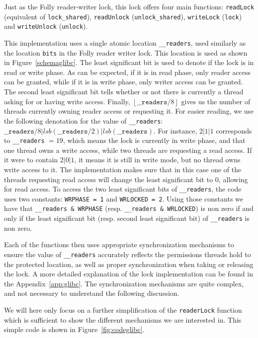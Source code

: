 Just as the Folly reader-writer lock, this lock offers four main functions: \texttt{readLock} (equivalent of \texttt{lock\_shared}), \texttt{readUnlock} (\texttt{unlock\_shared}), \texttt{writeLock} (\texttt{lock}) and \texttt{writeUnlock} (\texttt{unlock}).

This implementation uses a single atomic location \texttt{\_\_readers}, used similarly as the location \texttt{bits} in the Folly reader writer lock. This location is used as shown in Figure~\ref{schemaglibc}. The least significant bit is used to denote if the lock is in read or write phase. As can be expected, if it is in read phase, only reader access can be granted, while if it is in write phase, only writer access can be granted. The second least significant bit tells whether or not there is currently a thread asking for or having write access. Finally, $\left \lfloor{\mathtt{\_\_readers} / 8} \right \rfloor$ gives us the number of threads currently owning reader access or requesting it. For easier reading, we use the following denotation for the value of \texttt{\_\_readers}: $\mathtt{\_\_readers} / 8 | lsb(\mathtt{\_\_readers }/ 2) | lsb(\mathtt{\_\_readers})$. For instance, $2|1|1$ corresponds to \texttt{\_\_readers} $=19$, which means the lock is currently in write phase, and that one thread owns a write access, while two threads are requesting a read access. If it were to contain $2 | 0 | 1$, it means it is still in write mode, but no thread owns write access to it. The implementation makes sure that in this case one of the threads requesting read access will change the least significant bit to $0$, allowing for read access. To access the two least significant bits of \texttt{\_\_readers}, the code uses two constants: \texttt{WRPHASE = 1} and \texttt{WRLOCKED = 2}. Using those constants we have that \texttt{\_\_readers \& WRPHASE} (resp. \texttt{\_\_readers \& WRLOCKED}) is non zero if and only if the least significant bit (resp. second least significant bit) of \texttt{\_\_readers} is non zero. 

Each of the functions then uses appropriate synchronization mechanisms to ensure the value of \texttt{\_\_readers} accurately reflects the permissions threads hold to the protected location, as well as proper synchronization when taking or releasing the lock. A more detailed explanation of the lock implementation can be found in the Appendix~\ref{app:glibc}. The synchronization mechanisms are quite complex, and not necessary to understand the following discussion.

We will here only focus on a further simplification of the \texttt{readerLock} function which is sufficient to show the different mechanisms we are interested in. 
This simple code is shown in Figure~\ref{fig:codeglibc}.

